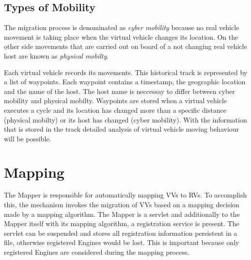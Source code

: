 % 


\subsection{Types of Mobility}
The migration process is denominated as \emph{cyber mobility} because no real vehicle movement is taking place when the virtual vehicle changes its location. On the other side movements that are carried out on board of a not changing real vehicle host are known as \emph{physical mobilty}.

Each virtual vehicle records its movements. This historical track is represented by a list of waypoints. Each waypoint contains a timestamp, the geographic location and the name of the host. The host name is neccessay to differ between cyber mobility and physical mobilty. Waypoints are stored when a virtual vehicle executes a cycle and its location has changed more than a specific distance (physical mobilty) or its host has changed (cyber mobility). With the information that is stored in the track detailed analysis of virtual vehicle moving behaviour will be possible.



\section{Mapping}
The Mapper is responsible for automatically mapping \acp{VV} to \acp{RV}. To accomplish this, the mechanism invokes 
the migration of \acp{VV} based on a mapping decision made by a mapping algorithm. The Mapper is a servlet and
additionally to the Mapper itself with its mapping algorithm, a registration service is present. The servlet can be suspended and stores all
registration information persistent in a file, otherwise registered Engines would be lost. This is important because only registered 
Engines are considered during the mapping process.

